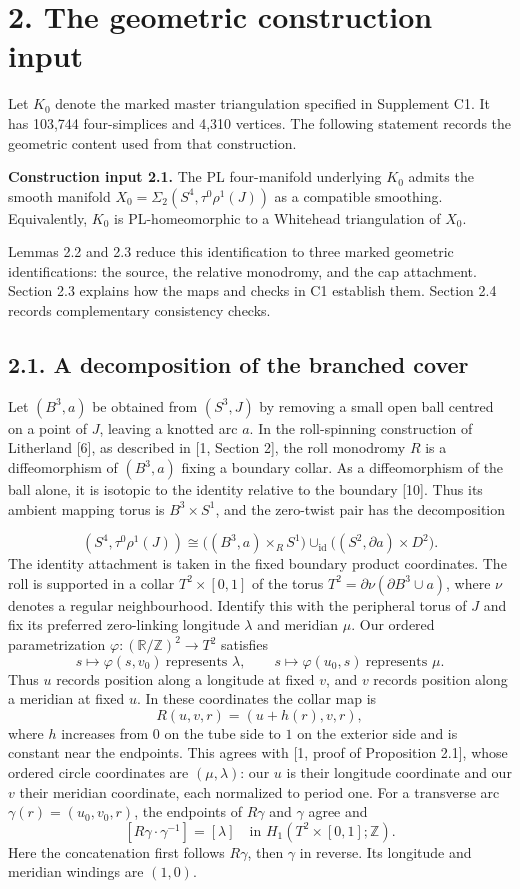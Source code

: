 \documentclass[11pt,letterpaper]{article}
\begin{document}
\section*{2. The geometric construction input}
Let $K_0$ denote the marked master triangulation specified in Supplement C1. It has 103,744 four-simplices and 4,310 vertices. The following statement records the geometric content used from that construction.

\medskip\noindent\textbf{Construction input 2.1.} The PL four-manifold underlying $K_0$ admits the smooth manifold $X_0=\Sigma_2(S^4,\tau^0\rho^1(J))$ as a compatible smoothing. Equivalently, $K_0$ is PL-homeomorphic to a Whitehead triangulation of $X_0$.

Lemmas 2.2 and 2.3 reduce this identification to three marked geometric identifications: the source, the relative monodromy, and the cap attachment. Section 2.3 explains how the maps and checks in C1 establish them. Section 2.4 records complementary consistency checks.

\subsection*{2.1. A decomposition of the branched cover}
Let $(B^3,a)$ be obtained from $(S^3,J)$ by removing a small open ball centred on a point of $J$, leaving a knotted arc $a$. In the roll-spinning construction of Litherland [6], as described in [1, Section 2], the roll monodromy $R$ is a diffeomorphism of $(B^3,a)$ fixing a boundary collar. As a diffeomorphism of the ball alone, it is isotopic to the identity relative to the boundary [10]. Thus its ambient mapping torus is $B^3\times S^1$, and the zero-twist pair has the decomposition

\[
(S^4,\tau^0\rho^1(J))\cong\bigl((B^3,a)\times_R S^1\bigr)\cup_{\mathrm{id}}\bigl((S^2,\partial a)\times D^2\bigr).
\]
The identity attachment is taken in the fixed boundary product coordinates. The roll is supported in a collar $T^2\times[0,1]$ of the torus $T^2=\partial\nu(\partial B^3\cup a)$, where $\nu$ denotes a regular neighbourhood. Identify this with the peripheral torus of $J$ and fix its preferred zero-linking longitude $\lambda$ and meridian $\mu$. Our ordered parametrization $\varphi:(\mathbb{R}/\mathbb{Z})^2\to T^2$ satisfies
\[
s\longmapsto\varphi(s,v_0)\ \text{represents }\lambda,
\qquad
s\longmapsto\varphi(u_0,s)\ \text{represents }\mu.
\]
Thus $u$ records position along a longitude at fixed $v$, and $v$ records position along a meridian at fixed $u$. In these coordinates the collar map is
\[
R(u,v,r)=(u+h(r),v,r),
\]
where $h$ increases from $0$ on the tube side to $1$ on the exterior side and is constant near the endpoints. This agrees with [1, proof of Proposition 2.1], whose ordered circle coordinates are $(\mu,\lambda)$: our $u$ is their longitude coordinate and our $v$ their meridian coordinate, each normalized to period one. For a transverse arc $\gamma(r)=(u_0,v_0,r)$, the endpoints of $R\gamma$ and $\gamma$ agree and
\[
[R\gamma\cdot\gamma^{-1}]=[\lambda]
\quad\text{in }H_1(T^2\times[0,1];\mathbb{Z}).
\]
Here the concatenation first follows $R\gamma$, then $\gamma$ in reverse. Its longitude and meridian windings are $(1,0)$.
\end{document}
